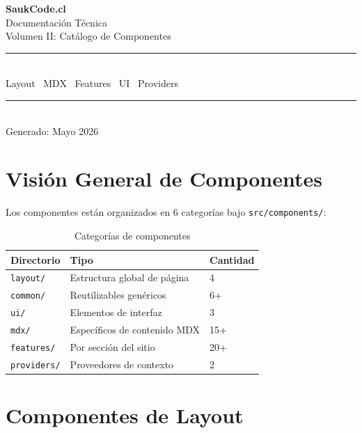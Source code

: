 \documentclass[12pt,a4paper]{article}
\begin{document}
\thispagestyle{empty}
\begin{center}
  \vspace*{3cm}
  {\Huge\bfseries\color{headerblue} SaukCode.cl}\\[0.5cm]
  {\Large\color{accent} Documentación Técnica}\\[0.3cm]
  {\large\color{codegray} Volumen II: Catálogo de Componentes}\\[2cm]
  \rule{10cm}{1.5pt}\\[0.5cm]
  {\normalsize Layout \textbullet\ MDX \textbullet\ Features \textbullet\ UI \textbullet\ Providers}\\[0.5cm]
  \rule{10cm}{1.5pt}\\[2cm]
  {\small\color{codegray} Generado: Mayo 2026}
\end{center}
\newpage

\tableofcontents
\newpage

\section{Visión General de Componentes}

Los componentes están organizados en 6 categorías bajo \texttt{src/components/}:

\begin{table}[h]
\centering
\begin{tabular}{lll}
\toprule
\textbf{Directorio} & \textbf{Tipo} & \textbf{Cantidad} \\
\midrule
\texttt{layout/} & Estructura global de página & 4 \\
\texttt{common/} & Reutilizables genéricos & 6+ \\
\texttt{ui/} & Elementos de interfaz & 3 \\
\texttt{mdx/} & Específicos de contenido MDX & 15+ \\
\texttt{features/} & Por sección del sitio & 20+ \\
\texttt{providers/} & Proveedores de contexto & 2 \\
\bottomrule
\end{tabular}
\caption{Categorías de componentes}
\end{table}

\section{Componentes de Layout}
\end{document}
